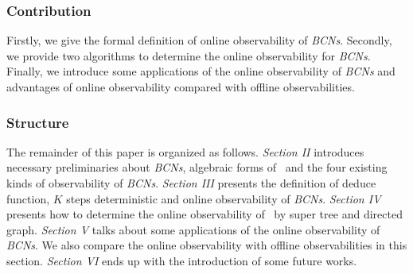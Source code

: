 \subsubsection*{Contribution}
Firstly, we give the formal definition of online observability of {\em BCNs}. Secondly, we provide two algorithms to determine the online observability for {\em BCNs}. Finally, we introduce some applications of the online observability of {\em BCNs} and advantages of online observability compared with offline observabilities. %
\subsubsection*{Structure}
The remainder of this paper is organized as follows. {\em Section II} introduces necessary preliminaries about {\em BCNs}, algebraic forms of \BCNs\ and the four existing kinds of observability of {\em BCNs}. {\em Section III} presents the definition of deduce function, $K$ steps deterministic and online observability of {\em BCNs}. {\em Section IV} presents how to determine the online observability of \BCNs\ by super tree and directed graph. {\em Section V} talks about some applications of the online observability of {\em BCNs}. We also compare the online observability with offline observabilities in this section. {\em Section VI} ends up  with the introduction of some future works.


